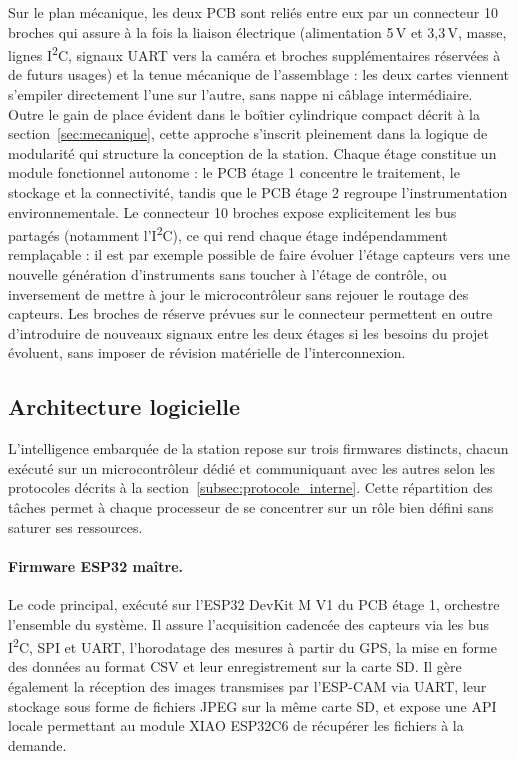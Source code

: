 Sur le plan mécanique, les deux PCB sont reliés entre eux par un connecteur
10 broches qui assure à la fois la liaison électrique (alimentation 5\,V et 3,3\,V,
masse, lignes I\textsuperscript{2}C, signaux UART vers la caméra et broches
supplémentaires réservées à de futurs usages) et la tenue mécanique de
l'assemblage : les deux cartes viennent s'empiler directement l'une sur l'autre,
sans nappe ni câblage intermédiaire. Outre le gain de place évident dans le
boîtier cylindrique compact décrit à la section~\ref{sec:mecanique}, cette
approche s'inscrit pleinement dans la logique de modularité qui structure la
conception de la station. Chaque étage constitue un module fonctionnel autonome :
le PCB étage 1 concentre le traitement, le stockage et la connectivité, tandis
que le PCB étage 2 regroupe l'instrumentation environnementale. Le connecteur
10 broches expose explicitement les bus partagés (notamment l'I\textsuperscript{2}C),
ce qui rend chaque étage indépendamment remplaçable : il est par exemple possible
de faire évoluer l'étage capteurs vers une nouvelle génération d'instruments
sans toucher à l'étage de contrôle, ou inversement de mettre à jour le
microcontrôleur sans rejouer le routage des capteurs. Les broches de réserve
prévues sur le connecteur permettent en outre d'introduire de nouveaux signaux
entre les deux étages si les besoins du projet évoluent, sans imposer de
révision matérielle de l'interconnexion.

\subsection{Architecture logicielle}\label{subsec:software}

L'intelligence embarquée de la station repose sur trois firmwares distincts,
chacun exécuté sur un microcontrôleur dédié et communiquant avec les autres
selon les protocoles décrits à la section~\ref{subsec:protocole_interne}.
Cette répartition des tâches permet à chaque processeur de se concentrer sur
un rôle bien défini sans saturer ses ressources.

\paragraph{Firmware ESP32 maître.}
Le code principal, exécuté sur l'ESP32 DevKit M V1 du PCB étage 1, orchestre
l'ensemble du système. Il assure l'acquisition cadencée des capteurs via les
bus I\textsuperscript{2}C, SPI et UART, l'horodatage des mesures à partir du
GPS, la mise en forme des données au format CSV et leur enregistrement sur la
carte SD. Il gère également la réception des images transmises par l'ESP-CAM
via UART, leur stockage sous forme de fichiers JPEG sur la même carte SD, et
expose une API locale permettant au module XIAO ESP32C6 de récupérer les
fichiers à la demande.

